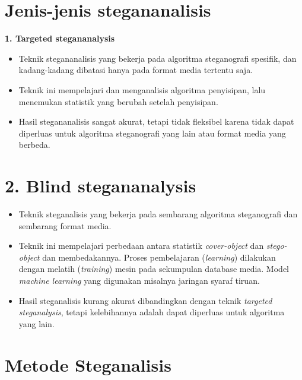 \documentclass{article}
\begin{document}

\section*{Jenis-jenis stegananalisis}

\textbf{1. Targeted stegananalysis}
\begin{itemize}
    \item Teknik stegananalisis yang bekerja pada algoritma steganografi spesifik, dan kadang-kadang dibatasi hanya pada format media tertentu saja.
    \item Teknik ini mempelajari dan menganalisis algoritma penyisipan, lalu menemukan statistik yang berubah setelah penyisipan.
    \item Hasil stegananalisis sangat akurat, tetapi tidak fleksibel karena tidak dapat diperluas untuk algoritma steganografi yang lain atau format media yang berbeda.
\end{itemize}

\newpage


\section*{2. Blind stegananalysis}

\begin{itemize}
    \item Teknik steganalisis yang bekerja pada sembarang algoritma steganografi dan sembarang format media.
    \item Teknik ini mempelajari perbedaan antara statistik \textit{cover-object} dan \textit{stego-object} dan membedakannya. Proses pembelajaran (\textit{learning}) dilakukan dengan melatih (\textit{training}) mesin pada sekumpulan database media. Model \textit{machine learning} yang digunakan misalnya jaringan syaraf tiruan.
    \item Hasil steganalisis kurang akurat dibandingkan dengan teknik \textit{targeted steganalysis}, tetapi kelebihannya adalah dapat diperluas untuk algoritma yang lain.
\end{itemize}

\newpage


\section*{Metode Steganalisis}
\end{document}
